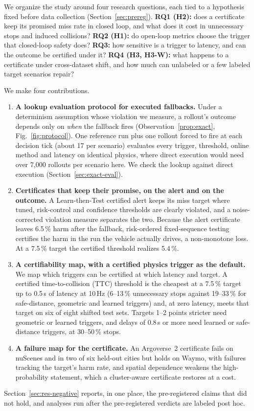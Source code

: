 \documentclass[lettersize,journal]{IEEEtran}
\begin{document}
We organize the study around four research questions, each tied to a
hypothesis fixed before data collection (Section~\ref{sec:prereg}).
\textbf{RQ1 (H2):} does a certificate keep its promised miss rate in
closed loop, and what does it cost in unnecessary stops and
induced collisions? \textbf{RQ2 (H1):} do open-loop metrics choose the
trigger that closed-loop safety does? \textbf{RQ3:} how sensitive is a trigger to latency, and can the outcome be certified under it? \textbf{RQ4 (H3, H3-W):} what happens to a certificate under cross-dataset shift, and how much can unlabeled or a few labeled target scenarios repair?

We make four contributions.
\begin{enumerate}
\item \textbf{A lookup evaluation protocol for executed fallbacks.}
Under a determinism assumption whose violation we measure, a rollout's
outcome depends only on \emph{when} the fallback fires
(Observation~\ref{prop:exact}, Fig.~\ref{fig:protocol}). One reference run
plus one rollout forced to fire at each decision tick (about 17 per
scenario) evaluates every trigger, threshold, online method and latency
on identical physics, where direct execution would need over 7{,}000
rollouts per scenario here. We check the lookup against direct execution
(Section~\ref{sec:exact-eval}).
\item \textbf{Certificates that keep their promise, on the alert and on
the outcome.} A Learn-then-Test certified alert keeps its miss target where
tuned, risk-control and confidence thresholds are clearly violated, and a
noise-corrected violation measure separates the two. Because the alert
certificate leaves 6.5\,\% harm after the fallback, risk-ordered
fixed-sequence testing certifies the harm in the run the vehicle actually
drives, a non-monotone loss. At a 7.5\,\% target the certified threshold
realizes 5.4\,\%.
\item \textbf{A certifiability map, with a certified physics trigger as the default.}
We map which triggers can be certified at which latency and target. A
certified time-to-collision (TTC) threshold is the cheapest at a 7.5\,\% target
up to 0.5\,s of latency at 10\,Hz (6--13\,\% unnecessary stops against 19--33\,\% for
safe-distance, geometric and learned triggers) and, at zero latency, meets that
target on six of eight shifted test sets. Targets 1--2 points stricter need
geometric or learned triggers, and delays of 0.8\,s or more need learned or
safe-distance triggers, at 30--50\,\% stops.
\item \textbf{A failure map for the certificate.} An Argoverse~2
certificate fails on nuScenes and in two of six held-out cities but holds
on Waymo, with failures tracking the target's harm rate, and spatial
dependence weakens the high-probability statement, which a cluster-aware certificate restores at a cost.
\end{enumerate}
Section~\ref{sec:res-negative} reports, in one place, the pre-registered
claims that did not hold, and analyses run after the pre-registered
verdicts are labeled post hoc.
\end{document}
